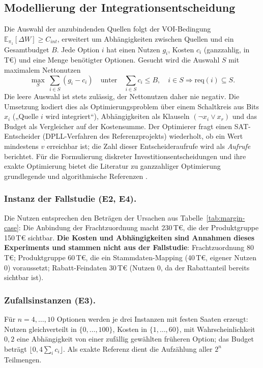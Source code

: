 \documentclass[a4paper,12pt,twoside]{report}
\theoremstyle{definition}
\newcommand{\E}{\mathbb{E}}
\begin{document}
\subsection{Modellierung der Integrationsentscheidung}
Die Auswahl der anzubindenden Quellen folgt der VOI-Bedingung $\E_{\pi_1}[\Delta W]\ge C_{int}$, erweitert um Abhängigkeiten zwischen Quellen und ein Gesamtbudget $B$. Jede Option $i$ hat einen Nutzen $g_i$, Kosten $c_i$ (ganzzahlig, in T€) und eine Menge benötigter Optionen. Gesucht wird die Auswahl $S$ mit maximalem Nettonutzen
\[
\max_{S}\ \sum_{i\in S}(g_i-c_i)\quad\text{unter}\quad \sum_{i\in S}c_i\le B,\quad i\in S\Rightarrow \mathrm{req}(i)\subseteq S .
\]
Die leere Auswahl ist stets zulässig, der Nettonutzen daher nie negativ. Die Umsetzung kodiert dies als Optimierungsproblem über einem Schaltkreis aus Bits $x_i$ („Quelle $i$ wird integriert“), Abhängigkeiten als Klauseln $(\lnot x_i\lor x_r)$ und das Budget als Vergleicher auf der Kostensumme. Der Optimierer fragt einen SAT-Entscheider (DPLL-Verfahren des Referenzprojekts) wiederholt, ob ein Wert mindestens $v$ erreichbar ist; die Zahl dieser Entscheideraufrufe wird als \emph{Aufrufe} berichtet. Für die Formulierung diskreter Investitionsentscheidungen und ihre exakte Optimierung bietet die Literatur zu ganzzahliger Optimierung grundlegende und algorithmische Referenzen \cite{wolsey98,achterberg09}.

\subsubsection{Instanz der Fallstudie (E2, E4).} Die Nutzen entsprechen den Beträgen der Ursachen aus Tabelle~\ref{tab:margin-case}: Die Anbindung der Frachtzuordnung macht 230\,T€, die der Produktgruppe 150\,T€ sichtbar. \textbf{Die Kosten und Abhängigkeiten sind Annahmen dieses Experiments und stammen nicht aus der Fallstudie}: Frachtzuordnung 80\,T€; Produktgruppe 60\,T€, die ein Stammdaten-Mapping (40\,T€, eigener Nutzen 0) voraussetzt; Rabatt-Feindaten 30\,T€ (Nutzen 0, da der Rabattanteil bereits sichtbar ist).

\subsubsection{Zufallsinstanzen (E3).} Für $n=4,\dots,10$ Optionen werden je drei Instanzen mit festen Saaten erzeugt: Nutzen gleichverteilt in $\{0,\dots,100\}$, Kosten in $\{1,\dots,60\}$, mit Wahrscheinlichkeit $0{,}2$ eine Abhängigkeit von einer zufällig gewählten früheren Option; das Budget beträgt $\lfloor 0{,}4\sum_i c_i\rfloor$. Als exakte Referenz dient die Aufzählung aller $2^n$ Teilmengen.
\end{document}
